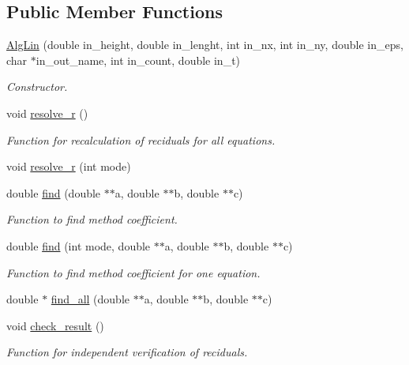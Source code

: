 \subsection*{Public Member Functions}
\begin{DoxyCompactItemize}
\item 
\hyperlink{classAlgLin_aff1317578ef31f6f1fd621015d6e6c5f}{AlgLin} (double in\_\-height, double in\_\-lenght, int in\_\-nx, int in\_\-ny, double in\_\-eps, char $\ast$in\_\-out\_\-name, int in\_\-count, double in\_\-t)
\begin{DoxyCompactList}\small\item\em Constructor. \end{DoxyCompactList}\item 
\hypertarget{classAlgLin_aed4bd552c5ef7d2b43e94c04286df633}{
void \hyperlink{classAlgLin_aed4bd552c5ef7d2b43e94c04286df633}{resolve\_\-r} ()}
\label{classAlgLin_aed4bd552c5ef7d2b43e94c04286df633}

\begin{DoxyCompactList}\small\item\em Function for recalculation of reciduals for all equations. \end{DoxyCompactList}\item 
void \hyperlink{classAlgLin_a7784f0707d7a081da5f85615f374df32}{resolve\_\-r} (int mode)
\item 
double \hyperlink{classAlgLin_a8323f1f45960e8d39184a61730fffffb}{find} (double $\ast$$\ast$a, double $\ast$$\ast$b, double $\ast$$\ast$c)
\begin{DoxyCompactList}\small\item\em Function to find method coefficient. \end{DoxyCompactList}\item 
double \hyperlink{classAlgLin_a0e6a96c3b072cb277bd7b1d4dd945472}{find} (int mode, double $\ast$$\ast$a, double $\ast$$\ast$b, double $\ast$$\ast$c)
\begin{DoxyCompactList}\small\item\em Function to find method coefficient for one equation. \end{DoxyCompactList}\item 
double $\ast$ \hyperlink{classAlgLin_ac5e5cd276c5be663d2d36ab92bf6ad83}{find\_\-all} (double $\ast$$\ast$a, double $\ast$$\ast$b, double $\ast$$\ast$c)
\item 
\hypertarget{classAlgLin_ad4c4596c11ad45040df273e022a508d7}{
void \hyperlink{classAlgLin_ad4c4596c11ad45040df273e022a508d7}{check\_\-result} ()}
\label{classAlgLin_ad4c4596c11ad45040df273e022a508d7}

\begin{DoxyCompactList}\small\item\em Function for independent verification of reciduals. \end{DoxyCompactList}\end{DoxyCompactItemize}


